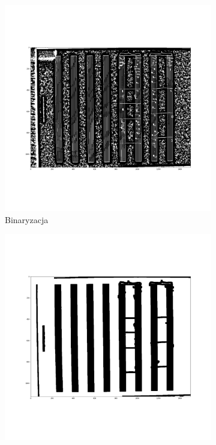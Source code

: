 \documentclass[12pt]{article}
\begin{document}
	\begin{figure}[h!]
		\centering
		\begin{subfigure}[b]{0.32\linewidth}
			\includegraphics[width=\linewidth]{zdj/Bin0.png}
			\caption{Binaryzacja}
		\end{subfigure}
		\begin{subfigure}[b]{0.32\linewidth}
			\includegraphics[width=\linewidth]{zdj/Bin1.png}

\end{subfigure}
\end{figure}
\end{document}
